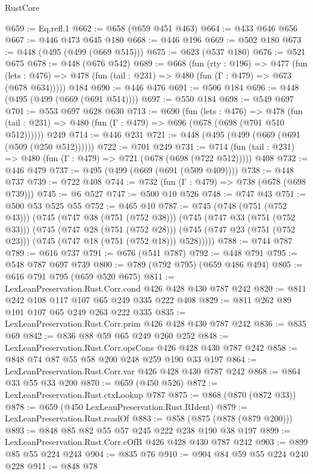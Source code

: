 \begin{lexlean}{RustCore}
\begin{coremodule}
@659 := Eq.refl.{1}
@662 := @658 (@659 @451 @463)
@664 := @433 @646 @656
@667 := @446 @473 @645 @180
@668 := @446 @196
@669 := @502 @180
@673 := @448 (@495 (@499 (@669 @515)))
@675 := @623 (@537 @180)
@676 := @521 @675
@678 := @448 (@676 @542)
@689 := @668
    (fun (rty : @196) =>
    @477
      (fun (lets : @476) => @478 (fun (tail : @231) => @480 (fun (Γ : @479) => @673 (@678 @634)))))
    @184
@690 := @446 @476
@691 := @506 @184
@696 := @448 (@495 (@499 (@669 (@691 @514))))
@697 := @550 @184
@698 := @549 @697
@701 := @553 @697 @628 @630
@713 := @690
    (fun (lets : @476) =>
    @478 (fun (tail : @231) => @480 (fun (Γ : @479) => @696 (@678 (@698 (@701 @510 @512))))))
    @249
@714 := @446 @231
@721 := @448 (@495 (@499 (@669 (@691 (@509 (@250 @512))))))
@722 := @701 @249
@731 := @714 (fun (tail : @231) => @480 (fun (Γ : @479) => @721 (@678 (@698 (@722 @512))))) @408
@732 := @446 @479
@737 := @495 (@499 (@669 (@691 (@509 @409))))
@738 := @448 @737
@739 := @722 @408
@744 := @732 (fun (Γ : @479) => @738 (@678 (@698 @739)))
@745 := @6 @527
@747 := @500 @10 @526
@748 := @747 @43
@751 := @500 @53 @525 @55
@752 := @465 @10
@787 := @745
    (@748 (@751 (@752 @43)))
    (@745
      (@747 @38 (@751 (@752 @38)))
      (@745
        (@747 @33 (@751 (@752 @33)))
        (@745
          (@747 @28 (@751 (@752 @28)))
          (@745 (@747 @23 (@751 (@752 @23))) (@745 (@747 @18 (@751 (@752 @18))) @528)))))
@788 := @744 @787
@789 := @616 @737
@791 := @676 (@541 @787)
@792 := @448 @791
@795 := @548 @787 @697 @739
@800 := @789 (@792 @795) (@659 @486 @494)
@805 := @616 @791 @795 (@659 @520 @675)
@811 := LexLeanPreservation.Rust.Corr.cond @426 @428 @430 @787 @242
@820 := @811 @242 @108 @117 @107 @65 @249 @335 @222 @408
@829 := @811 @262 @89 @101 @107 @65 @249 @263 @222 @335
@835 := LexLeanPreservation.Rust.Corr.prim @426 @428 @430 @787 @242
@836 := @835 @69
@842 := @836 @88 @59 @65 @249 @260 @252
@848 := LexLeanPreservation.Rust.Corr.opsCons @426 @428 @430 @787 @242
@858 := @848 @74 @87 @55 @58 @200 @248 @259 @190 @33 @197
@864 := LexLeanPreservation.Rust.Corr.var @426 @428 @430 @787 @242
@868 := @864 @33 @55 @33 @200
@870 := @659 (@450 @526)
@872 := LexLeanPreservation.Rust.ctxLookup @787
@875 := @868 (@870 (@872 @33))
@878 := @659 (@450 LexLeanPreservation.Rust.RIdent)
@879 := LexLeanPreservation.Rust.readOf
@883 := @858 (@875 (@878 (@879 @200)))
@893 := @848 @85 @82 @55 @57 @245 @222 @238 @190 @38 @197
@899 := LexLeanPreservation.Rust.Corr.eOfB @426 @428 @430 @787 @242
@903 := @899 @85 @55 @224 @243
@904 := @835 @76
@910 := @904 @84 @59 @55 @224 @240 @228
@911 := @848 @78

\end{coremodule}
\end{lexlean}
